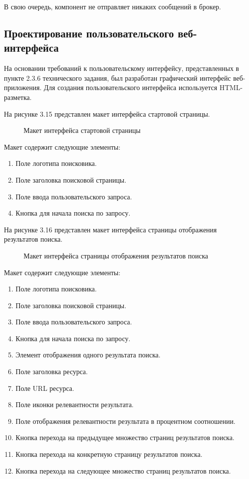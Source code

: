 В свою очередь, компонент не отправляет никаких сообщений в брокер.

\subsection{Проектирование пользовательского веб-интерфейса}

На основании требований к пользовательскому интерфейсу, представленных в пункте 2.3.6 технического задания, был разработан графический интерфейс веб-приложения. Для создания пользовательского интерфейса используется HTML-разметка.

На рисунке 3.15 представлен макет интерфейса стартовой страницы.
\begin{figure}[H]
\caption{Макет интерфейса стартовой страницы}
\label{web/main.png:image}
\end{figure}
Макет содержит следующие элементы:
\begin{enumerate}
\item Поле логотипа поисковика.
\item Поле заголовка поисковой страницы.
\item Поле ввода пользовательского запроса.
\item Кнопка для начала поиска по запросу.
\end{enumerate}

На рисунке 3.16 представлен макет интерфейса страницы отображения результатов поиска.
\begin{figure}[H]
\caption{Макет интерфейса страницы отображения результатов поиска}
\label{web/results.png:image}
\end{figure}
Макет содержит следующие элементы:
\begin{enumerate}
\item Поле логотипа поисковика.
\item Поле заголовка поисковой страницы.
\item Поле ввода пользовательского запроса.
\item Кнопка для начала поиска по запросу.
\item Элемент отображения одного результата поиска.
\item Поле заголовка ресурса.
\item Поле URL ресурса.
\item Поле иконки релевантности результата.
\item Поле отображения релевантности результата в процентном соотношении.
\item Кнопка перехода на предыдущее множество страниц результатов поиска.
\item Кнопка перехода на конкретную страницу результатов поиска.
\item Кнопка перехода на следующее множество страниц результатов поиска.
\end{enumerate}